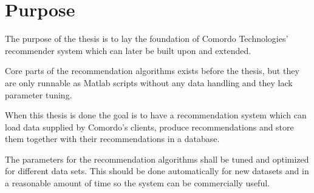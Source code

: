 
\section{Purpose}\label{sec:intro:purpose}

The purpose of the thesis is to lay the foundation of Comordo Technologies' recommender system which can later be built upon and extended.

Core parts of the recommendation algorithms exists before the thesis, but they are only runnable as Matlab scripts without any data handling and they lack parameter tuning.

When this thesis is done the goal is to have a recommendation system which can load data supplied by Comordo's clients, produce recommendations and store them together with their recommendations in a database.

The parameters for the recommendation algorithms shall be tuned and optimized for different data sets. This should be done automatically for new datasets and in a reasonable amount of time so the system can be commercially useful.

